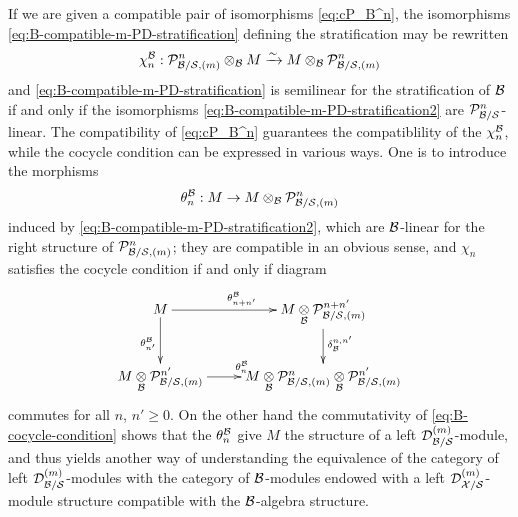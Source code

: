 \documentclass{article}
\theoremstyle{change}
\numberwithin{equation}{subsubsection}
\newcommand{\tensu}[1]{\underset{{#1}}{\otimes}}
\begin{document}
If we are given a compatible pair of isomorphisms \ref{eq:cP_B^n}, the
isomorphisms \ref{eq:B-compatible-m-PD-stratification} defining the
stratification may be rewritten
\begin{equation}
  \label{eq:B-compatible-m-PD-stratification2}
  \chi^{\cal B}_n:{\cal P}^n_{{\cal B}/{\cal S},(m)}\otimes_{\cal B} M\xrightarrow{\sim} M\otimes_{\cal B}{\cal P}^n_{{\cal B}/{\cal S},(m)}
\end{equation}
and \ref{eq:B-compatible-m-PD-stratification} is semilinear for the
stratification of ${\cal B}$ if and only if the isomorphisms
\ref{eq:B-compatible-m-PD-stratification2} are
${\cal P}^n_{{\cal B}/{\cal S}}$-linear. The compatibility of \ref{eq:cP_B^n}
guarantees the compatiblility of the $\chi^{\cal B}_n$, while the cocycle
condition can be expressed in various ways. One is to introduce the
morphisms
\begin{equation}
  \label{eq:theta^B}
  \theta^{\cal B}_n:M\to M\otimes_{\cal B}{\cal P}^n_{{\cal B}/{\cal S},(m)}
\end{equation}
induced by \ref{eq:B-compatible-m-PD-stratification2}, which are
${\cal B}$-linear for the right structure of ${\cal P}^n_{{\cal B}/{\cal S},(m)}$; they
are compatible in an obvious sense, and $\chi_n$ satisfies the cocycle
condition if and only if diagram
\begin{equation}
  \label{eq:B-cocycle-condition}
  \xymatrix{
    M\ar[r]^{\theta^\cB_{n+n'}}\ar[d]_{\theta^\cB_{n'}}
    &M\tensu\cB\cP^{n+n'}_{\cB/\cS,(m)}\ar[d]^{\delta^{n,n'}_\cB}\\
    M\tensu\cB\cP^{n'}_{\cB/\cS,(m)}
    \ar[r]^{\theta^\cB_n}
    &M\tensu\cB\cP^n_{\cB/\cS,(m)}\tensu\cB\cP^{n'}_{\cB/\cS,(m)}
  }
\end{equation}
commutes for all $n$, $n'\ge0$. On the other hand the commutativity of
\ref{eq:B-cocycle-condition} shows that the $\theta^{\cal B}_n$ give $M$
the structure of a left ${{\cal D}}^{({m})}_{{\cal B}/{\cal S}}$-module, and thus
yields another way of understanding the equivalence of the
category of left ${{\cal D}}^{({m})}_{{\cal B}/{\cal S}}$-modules with the category of
${\cal B}$-modules endowed with a 
left ${{\cal D}}^{({m})}_{{\cal X}/{\cal S}}$-module structure compatible with the
${\cal B}$-algebra structure. 
\end{document}
